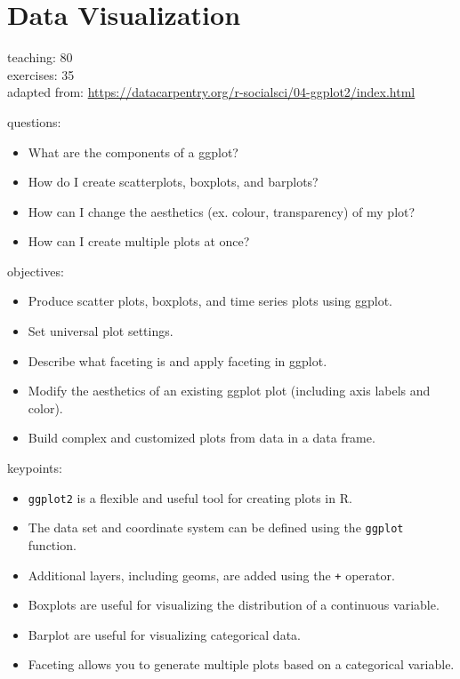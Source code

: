 \documentclass[]{book}
\providecommand{\tightlist}{%
  \setlength{\itemsep}{0pt}\setlength{\parskip}{0pt}}
\begin{document}
\chapter{Data Visualization}\label{data-visualization}

teaching: 80\\
exercises: 35\\
adapted from:
\url{https://datacarpentry.org/r-socialsci/04-ggplot2/index.html}

questions:

\begin{itemize}
\tightlist
\item
  What are the components of a ggplot?\\
\item
  How do I create scatterplots, boxplots, and barplots?\\
\item
  How can I change the aesthetics (ex. colour, transparency) of my
  plot?\\
\item
  How can I create multiple plots at once?
\end{itemize}

objectives:

\begin{itemize}
\tightlist
\item
  Produce scatter plots, boxplots, and time series plots using ggplot.\\
\item
  Set universal plot settings.\\
\item
  Describe what faceting is and apply faceting in ggplot.\\
\item
  Modify the aesthetics of an existing ggplot plot (including axis
  labels and color).\\
\item
  Build complex and customized plots from data in a data frame.
\end{itemize}

keypoints:

\begin{itemize}
\tightlist
\item
  \texttt{ggplot2} is a flexible and useful tool for creating plots in
  R.\\
\item
  The data set and coordinate system can be defined using the
  \texttt{ggplot} function.\\
\item
  Additional layers, including geoms, are added using the \texttt{+}
  operator.\\
\item
  Boxplots are useful for visualizing the distribution of a continuous
  variable.\\
\item
  Barplot are useful for visualizing categorical data.\\
\item
  Faceting allows you to generate multiple plots based on a categorical
  variable.
\end{itemize}
\end{document}
